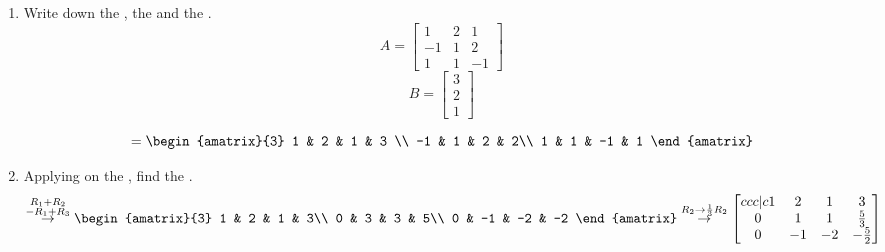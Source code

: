 \documentclass[12pt, a4paper, twoside]{article}
\begin{document}
		\begin{enumerate}
			\item Write down the , the  and the .
			\ans
				\begin{equation}
					A= 
					\begin{bmatrix}
					1 & 2 & 1 \\
					-1 & 1 & 2\\
					1 & 1 & -1
					\end{bmatrix}
				\end{equation}
				\begin{equation}
					B= 
					\begin{bmatrix}
						3\\
						2\\
						1
					\end{bmatrix}
				\end{equation}
				
				\begin{equation}
					[A|B]=
					\begin{amatrix}{3}
						1 & 2 & 1  & 3 \\
						-1 & 1 & 2 & 2\\
						1 & 1 & -1 & 1
					\end{amatrix}
				\end{equation}	
				
			\item Applying  on the , find the .
			\ans
			\begin{multline}
				[A|B]
				\rop{\Row{1}+\Row{2}\\-\Row{1}+\Row{3}}
				\begin{amatrix}{3}
					1 & 2 & 1 & 3\\
					0 & 3 & 3 & 5\\
					0 & -1 & -2 & -2
				\end{amatrix}
				\rop{\Row{2}\to\frac{1}{3}\Row{2}}
				\begin{bmatrix}{ccc|c}
					1 & 2 & 1 & 3\\
					0 & 1 & 1 & \frac{5}{3}\\
					0 & -1 & -2 & -\frac{5}{2}
				\end{bmatrix}
			\end{multline}
			
			
		\end{enumerate}
		

		
	

	
	
	


	
\end{document}
